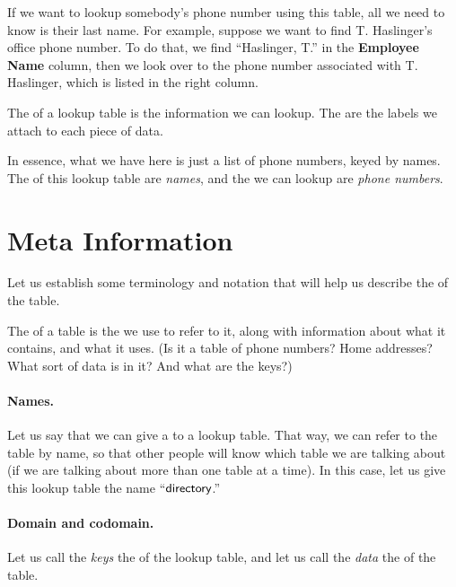 \documentclass[../../../main.tex]{subfiles}
\begin{document}
If we want to lookup somebody's phone number using this table, all we need to know is their last name. For example, suppose we want to find T. Haslinger's office phone number. To do that, we find ``Haslinger, T.'' in the \textbf{Employee Name} column, then we look over to the phone number associated with T. Haslinger, which is listed in the right column.

\begin{terminology}
  The  of a lookup table is the information we can lookup. The  are the labels we attach to each piece of data.
\end{terminology}

In essence, what we have here is just a list of phone numbers, keyed by names. The  of this lookup table are \emph{names}, and the  we can lookup are \emph{phone numbers}.


\section{Meta Information}

Let us establish some terminology and notation that will help us describe the  of the table.

\begin{aside}
  \begin{remark}
    The  of a table is the  we use to refer to it, along with information about what  it contains, and what  it uses. (Is it a table of phone numbers? Home addresses? What sort of data is in it? And what are the keys?)
  \end{remark}
\end{aside} 

\paragraph{Names.} Let us say that we can give a  to a lookup table. That way, we can refer to the table by name, so that other people will know which table we are talking about (if we are talking about more than one table at a time). In this case, let us give this lookup table the name ``$\mathsf{directory}$.''

\paragraph{Domain and codomain.} Let us call the \emph{keys} the  of the lookup table, and let us call the \emph{data} the  of the table.
\end{document}
